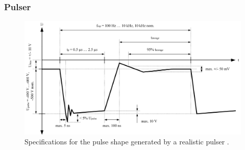 		
		\subsubsection{Pulser}
				
		\begin{figure}[h]
			\centering
			\includegraphics[width=\textwidth]{Bilder/Pulser_theretical_shape.jpg}
			\caption{Specifications for the pulse shape generated by a realistic pulser \cite{Diss_Meyer}.}
			\label{fig:PulserTheoCurve}
		\end{figure}
